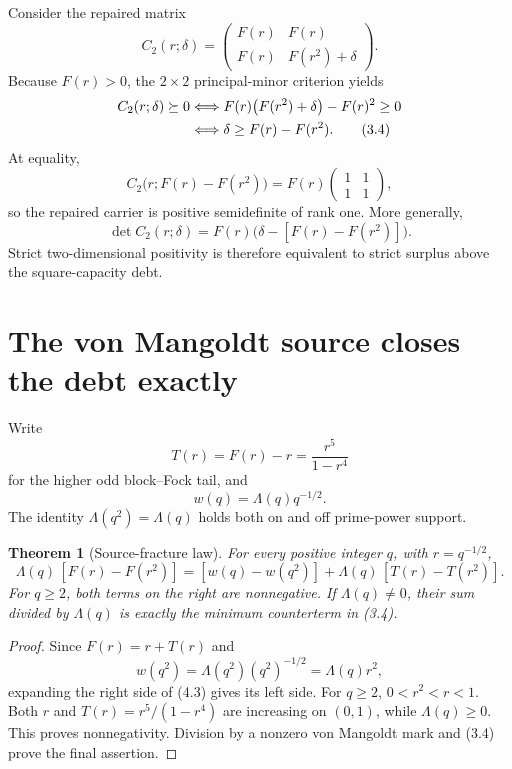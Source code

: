 \documentclass[11pt]{article}
\newtheorem{theorem}{Theorem}[section]
\theoremstyle{definition}
\theoremstyle{remark}
\newcommand{\LambdaVM}{\Lambda}
\newcommand{\psd}{\succeq 0}
\begin{document}
Consider the repaired matrix
\[
 C_2(r;\delta)=
 \begin{pmatrix}
 F(r)&F(r)\\
 F(r)&F(r^2)+\delta
 \end{pmatrix}.                                       \tag{3.3}
\]
Because $F(r)>0$, the $2\times2$ principal-minor criterion yields
\begin{align}
 C_2(r;\delta)\psd
 &\Longleftrightarrow
 F(r)\bigl(F(r^2)+\delta\bigr)-F(r)^2\geq0 \notag\\
 &\Longleftrightarrow
 \delta\geq F(r)-F(r^2).                               \tag{3.4}
\end{align}
At equality,
\[
 C_2\bigl(r;F(r)-F(r^2)\bigr)
 =
 F(r)\begin{pmatrix}1&1\\1&1\end{pmatrix},             \tag{3.5}
\]
so the repaired carrier is positive semidefinite of rank one.  More generally,
\[
 \det C_2(r;\delta)
 =F(r)\bigl(\delta-[F(r)-F(r^2)]\bigr).                \tag{3.6}
\]
Strict two-dimensional positivity is therefore equivalent to strict surplus above the
square-capacity debt.

\section{The von Mangoldt source closes the debt exactly}

Write
\[
 T(r)=F(r)-r=\frac{r^5}{1-r^4}                         \tag{4.1}
\]
for the higher odd block--Fock tail, and
\[
 w(q)=\LambdaVM(q)q^{-1/2}.                            \tag{4.2}
\]
The identity $\LambdaVM(q^2)=\LambdaVM(q)$ holds both on and off prime-power support.

\begin{theorem}[Source-fracture law]
\label{thm:fracture}
For every positive integer $q$, with $r=q^{-1/2}$,
\[
 \LambdaVM(q)\,[F(r)-F(r^2)]
 =
 [w(q)-w(q^2)]
 +\LambdaVM(q)\,[T(r)-T(r^2)].                         \tag{4.3}
\]
For $q\geq2$, both terms on the right are nonnegative.  If
$\LambdaVM(q)\neq0$, their sum divided by $\LambdaVM(q)$ is exactly the minimum counterterm
in \emph{(3.4)}.
\end{theorem}

\begin{proof}
Since $F(r)=r+T(r)$ and
\[
 w(q^2)=\LambdaVM(q^2)(q^2)^{-1/2}
       =\LambdaVM(q)r^2,
\]
expanding the right side of (4.3) gives its left side.  For $q\geq2$,
$0<r^2<r<1$.  Both $r$ and $T(r)=r^5/(1-r^4)$ are increasing on $(0,1)$, while
$\LambdaVM(q)\geq0$.  This proves nonnegativity.  Division by a nonzero von Mangoldt mark and
(3.4) prove the final assertion.
\end{proof}
\end{document}
